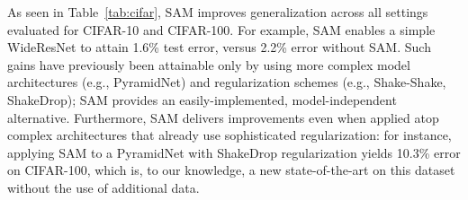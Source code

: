\documentclass{article} %
\begin{document}
As seen in Table~\ref{tab:cifar}, SAM improves generalization across all settings evaluated for CIFAR-10 and CIFAR-100.  For example, SAM enables a simple WideResNet to attain 1.6\% test error, versus 2.2\% error without SAM.  Such gains have previously been attainable only by using more complex model architectures (e.g., PyramidNet) and regularization schemes (e.g., Shake-Shake, ShakeDrop); SAM provides an easily-implemented, model-independent alternative.  Furthermore, SAM delivers improvements even when applied atop complex architectures that already use sophisticated regularization: for instance, applying SAM to a PyramidNet with ShakeDrop regularization yields 10.3\% error on CIFAR-100, which is, to our knowledge, a new state-of-the-art on this dataset without the use of additional data.

\begin{table}[!htb]
\small
\centering
\begin{tabular}{ll|cc|cc|}


\end{tabular}
\end{table}
\end{document}
